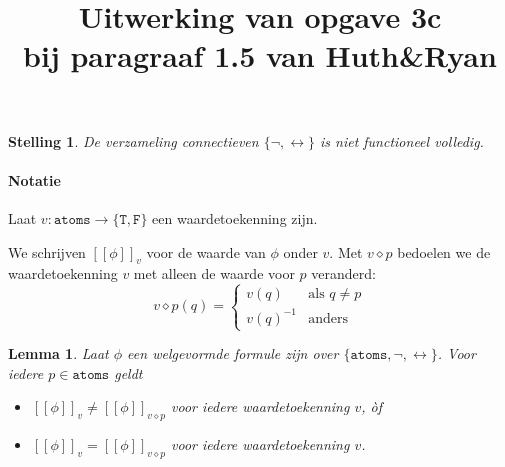 \documentclass[a4paper,11pt]{article}
\title{Uitwerking van opgave 3c\\
\normalsize{bij paragraaf 1.5 van Huth\&Ryan}}
\date{}
\newtheorem{lemma}{Lemma}
\newtheorem*{theorem}{Stelling}
\begin{document}
\maketitle


\begin{theorem}\label{thm:incomplete}
  De verzameling connectieven $\{\neg, \leftrightarrow\}$ is niet functioneel
    volledig.
\end{theorem}

\paragraph{Notatie}

Laat $v : \mathtt{atoms} \rightarrow \{\mathtt{T}, \mathtt{F}\}$ een
waardetoekenning zijn.

We schrijven $[\![ \phi ]\!]_{v}$ voor de waarde van $\phi$ onder $v$.
Met $v \diamond p$ bedoelen we de waardetoekenning $v$ met alleen de waarde voor $p$
veranderd:
\begin{equation*}
  v \diamond p(q) =
  \begin{cases}
    v(q)     & \mbox{als }q \neq p \\
    v(q)^{-1} & \mbox{anders}
  \end{cases}
\end{equation*}

\renewcommand{\labelitemi}{}
\begin{lemma}\label{lem:linear}
  Laat $\phi$ een welgevormde formule zijn over $\{\mathtt{atoms}, \neg, \leftrightarrow\}$.
  Voor iedere $p \in \mathtt{atoms}$ geldt
  \begin{itemize}
    \item $[\![ \phi ]\!]_{v} \neq [\![ \phi ]\!]_{v \diamond p}$ voor iedere waardetoekenning $v$, \`of
    \item $[\![ \phi ]\!]_{v} = [\![ \phi ]\!]_{v \diamond p}$ voor iedere waardetoekenning $v$.
  \end{itemize}
\end{lemma}
\end{document}
